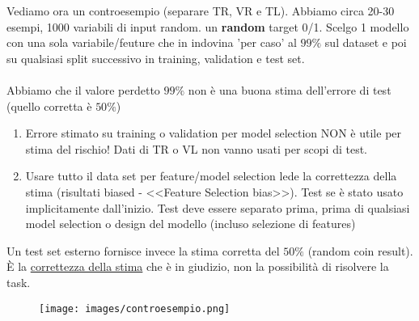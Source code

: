 \begin{example}
    Vediamo ora un controesempio (separare TR, VR e TL). Abbiamo circa 20-30 esempi, 1000 variabili di input random.
    un \textbf{random} target 0/1. Scelgo 1 modello con una sola variabile/feuture che in indovina 'per caso' al
    $99\%$ sul dataset e poi su qualsiasi split successivo in training, validation e test set.\\\\
    Abbiamo che il valore perdetto $99\%$ non è una buona stima dell'errore di test (quello corretta è $50\%$)
    \begin{enumerate}
        \item Errore stimato su training o validation per model selection NON è utile per stima del rischio! Dati di TR o VL non vanno usati per scopi di test.
        \item Usare tutto il data set per feature/model selection lede la correttezza della stima (risultati biased - <<Feature Selection bias>>). Test se è stato usato implicitamente dall'inizio.
        Test deve essere separato prima, prima di qualsiasi model selection o design del modello (incluso selezione di features)
    \end{enumerate}
    Un test set esterno fornisce invece la stima corretta del $50\%$ (random coin result). È la \underline{correttezza della stima} che è in giudizio, non la possibilità di risolvere la task.
    \begin{figure}[h!]
        \centering
        \texttt{[image: images/controesempio.png]}
    \end{figure}
\end{example}

